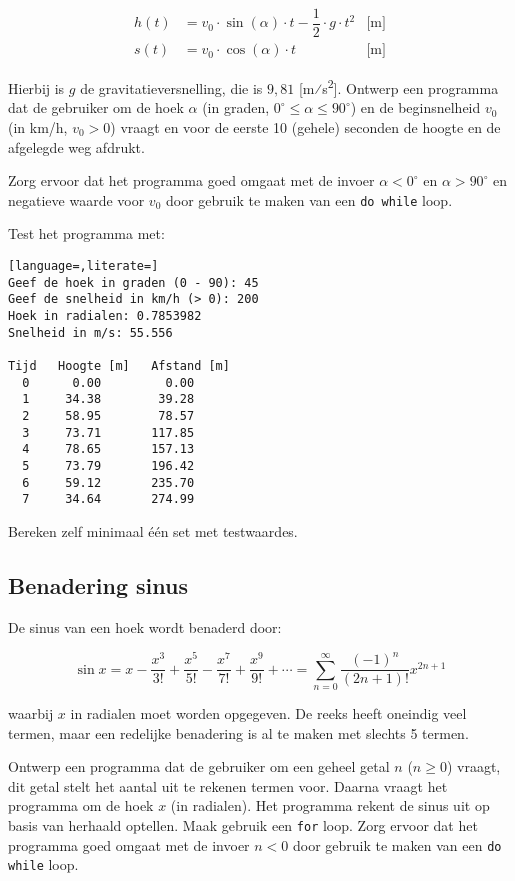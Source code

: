 \documentclass[a4paper,10pt,fleqn,twoside]{article}
\begin{document}
\begin{align*}
h(t) &= v_0\cdot \sin(\alpha)\cdot t - \dfrac{1}{2}\cdot g\cdot t^2 & \text{[m]} \\
s(t) &= v_0\cdot \cos(\alpha)\cdot t & \text{[m]} 
\end{align*}

Hierbij is $g$ de gravitatieversnelling, die is $9,81$ [m⁄s\textsuperscript{2}]. Ontwerp een programma dat de gebruiker om de hoek $\alpha$ (in graden, $0^\circ \leq \alpha \leq 90^\circ$) en de beginsnelheid $v_0$ (in km/h, $v_0 > 0$) vraagt en voor de eerste 10 (gehele) seconden de hoogte en de afgelegde weg afdrukt.

Zorg ervoor dat het programma goed omgaat met de invoer $\alpha < 0^\circ$ en $\alpha > 90^\circ$ en negatieve waarde voor $v_0$ door gebruik te maken van een \lstinline|do while| loop.

Test het programma met:

\begin{lstlisting}[language=,literate=]
Geef de hoek in graden (0 - 90): 45
Geef de snelheid in km/h (> 0): 200
Hoek in radialen: 0.7853982
Snelheid in m/s: 55.556

Tijd   Hoogte [m]   Afstand [m]
  0      0.00         0.00
  1     34.38        39.28
  2     58.95        78.57
  3     73.71       117.85
  4     78.65       157.13
  5     73.79       196.42
  6     59.12       235.70
  7     34.64       274.99
\end{lstlisting}

Bereken zelf minimaal één set met testwaardes.

\subsection{Benadering sinus}
De sinus van een hoek wordt benaderd door:

\begin{equation*}
\sin x = x - \dfrac{x^3}{3!} + \dfrac{x^5}{5!} - \dfrac{x^7}{7!} + \dfrac{x^9}{9!} + \cdots = \sum_{n=0}^\infty \dfrac{(-1)^n}{(2n+1)!} x^{2n+1}
\end{equation*}

waarbij $x$ in radialen moet worden opgegeven. De reeks heeft oneindig veel termen, maar een redelijke benadering is al te maken met slechts 5 termen.

Ontwerp een programma dat de gebruiker om een geheel getal $n$ ($n \geq 0$) vraagt, dit getal stelt het aantal uit te rekenen termen voor. Daarna vraagt het programma om de hoek $x$ (in radialen). Het programma rekent de sinus uit op basis van herhaald optellen. Maak gebruik een \lstinline|for| loop. Zorg ervoor dat het programma goed omgaat met de invoer $n < 0$ door gebruik te maken van een \lstinline|do while| loop.
\end{document}
